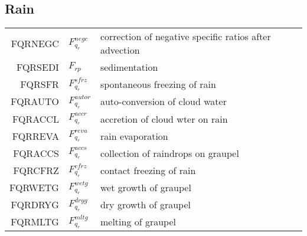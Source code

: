   \subsection{Rain}
  \begin{tabular}{rll}

       FQRNEGC      &$F_{q_r}^{negc}$ &correction of negative specific ratios after advection\\
       FQRSEDI      &$F_{rp}$ &sedimentation\\
       FQRSFR       &$F_{q_r}^{sfrz}$ &spontaneous freezing of rain\\
       FQRAUTO      &$F_{q_r}^{autor}$ &auto-conversion of cloud water\\
       FQRACCL      &$F_{q_r}^{accr}$ &accretion of cloud wter on rain\\
       FQRREVA      &$F_{q_r}^{reva}$ &rain evaporation\\
       FQRACCS      &$F_{q_r}^{accs}$ &collection of raindrops on graupel\\
       FQRCFRZ      &$F_{q_r}^{cfrz}$ &contact freezing of rain\\
       FQRWETG      &$F_{q_r}^{wetg}$ &wet growth of graupel\\
       FQRDRYG      &$F_{q_r}^{dryg}$ &dry growth of graupel\\
       FQRMLTG      &$F_{q_r}^{mltg}$ &melting of graupel\\
  \end{tabular}

